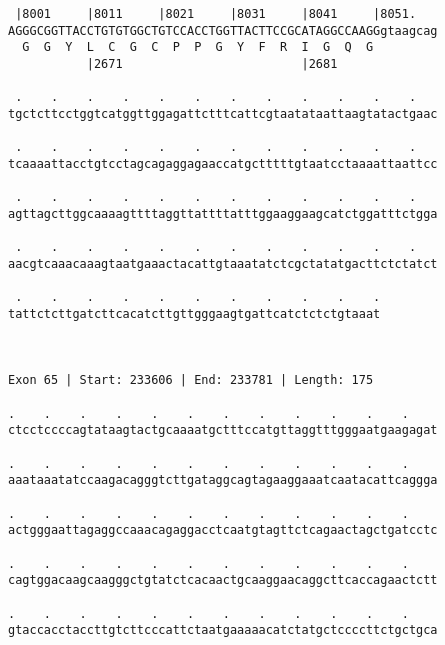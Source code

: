 \documentclass{article}
\begin{document}
\begin{Verbatim}
 |8001     |8011     |8021     |8031     |8041     |8051.   
AGGGCGGTTACCTGTGTGGCTGTCCACCTGGTTACTTCCGCATAGGCCAAGGgtaagcag
  G  G  Y  L  C  G  C  P  P  G  Y  F  R  I  G  Q  G         
           |2671                         |2681              
  
 .    .    .    .    .    .    .    .    .    .    .    .   
tgctcttcctggtcatggttggagattctttcattcgtaatataattaagtatactgaac
                                                            
 .    .    .    .    .    .    .    .    .    .    .    .   
tcaaaattacctgtcctagcagaggagaaccatgctttttgtaatcctaaaattaattcc
                                                            
 .    .    .    .    .    .    .    .    .    .    .    .   
agttagcttggcaaaagttttaggttattttatttggaaggaagcatctggatttctgga
                                                            
 .    .    .    .    .    .    .    .    .    .    .    .   
aacgtcaaacaaagtaatgaaactacattgtaaatatctcgctatatgacttctctatct
                                                            
 .    .    .    .    .    .    .    .    .    .    .
tattctcttgatcttcacatcttgttgggaagtgattcatctctctgtaaat
                                                    
                                                    
 
Exon 65 | Start: 233606 | End: 233781 | Length: 175
 
.    .    .    .    .    .    .    .    .    .    .    .    
ctcctccccagtataagtactgcaaaatgctttccatgttaggtttgggaatgaagagat
                                                            
.    .    .    .    .    .    .    .    .    .    .    .    
aaataaatatccaagacagggtcttgataggcagtagaaggaaatcaatacattcaggga
                                                            
.    .    .    .    .    .    .    .    .    .    .    .    
actgggaattagaggccaaacagaggacctcaatgtagttctcagaactagctgatcctc
                                                            
.    .    .    .    .    .    .    .    .    .    .    .    
cagtggacaagcaagggctgtatctcacaactgcaaggaacaggcttcaccagaactctt
                                                            
.    .    .    .    .    .    .    .    .    .    .    .    
gtaccacctaccttgtcttcccattctaatgaaaaacatctatgctccccttctgctgca
                                                            

\end{Verbatim}
\end{document}
